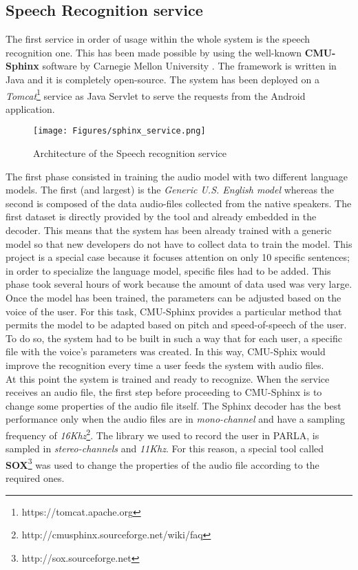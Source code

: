 \subsection{Speech Recognition service}
\label{ssec:training_sr_model}

The first service in order of usage within the whole system is the speech recognition one. This has been made possible by using the well-known \textbf{CMU-Sphinx} software by Carnegie Mellon University \cite{walker2004sphinx}. The framework is written in Java and it is completely open-source. The system has been deployed on a \textit{Tomcat}\footnote{https://tomcat.apache.org} service as Java Servlet to serve the requests from the Android application. \\

\begin{figure}[!ht]
	\centering
	\texttt{[image: Figures/sphinx\_service.png]}
	\caption{Architecture of the Speech recognition service}
	\label{fig:sphinx_service}
\end{figure}

\noindent The first phase consisted in training the audio model with two different language models. The first (and largest) is the \textit{Generic U.S. English model} whereas the second is composed of the data audio-files collected from the native speakers. The first dataset is directly provided by the tool and already embedded in the decoder. This means that the system has been already trained with a generic model so that new developers do not have to collect data to train the model. This project is a special case because it focuses attention on only 10 specific sentences; in order to specialize the language model, specific files had to be added. This phase took several hours of work because the amount of data used was very large. \\

\noindent Once the model has been trained, the parameters can be adjusted based on the voice of the user. For this task, CMU-Sphinx provides a particular method that permits the model to be adapted based on pitch and speed-of-speech of the user. To do so, the system had to be built in such a way that for each user, a specific file with the voice's parameters was created. In this way, CMU-Sphix would improve the recognition every time a user feeds the system with audio files. \\

\noindent At this point the system is trained and ready to recognize. When the service receives an audio file, the first step before proceeding to CMU-Sphinx is to change some properties of the audio file itself. The Sphinx decoder has the best performance only when the audio files are in \textit{mono-channel} and have a sampling frequency of \textit{16Khz}\footnote{http://cmusphinx.sourceforge.net/wiki/faq}. The library we used to record the user in PARLA, is sampled in \textit{stereo-channels} and \textit{11Khz}. For this reason, a special tool called \textbf{SOX}\footnote{http://sox.sourceforge.net} was used to change the properties of the audio file according to the required ones. \\

